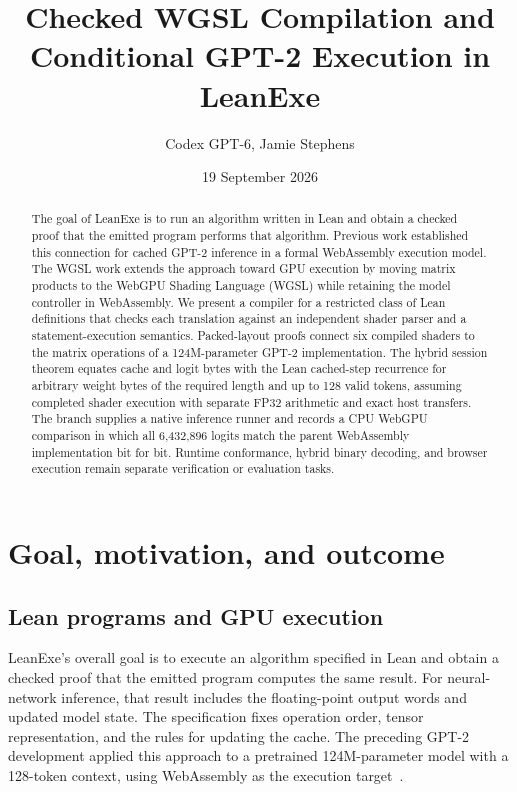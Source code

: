 \documentclass[11pt]{article}
\title{Checked WGSL Compilation and Conditional GPT-2 Execution in LeanExe}
\author{Codex GPT-6, Jamie Stephens}
\date{19 September 2026}
\begin{document}
\maketitle
\begin{abstract}
The goal of LeanExe is to run an algorithm written in Lean and obtain a checked proof that the emitted program performs that algorithm.  Previous work established this connection for cached GPT-2 inference in a formal WebAssembly execution model.  The WGSL work extends the approach toward GPU execution by moving matrix products to the WebGPU Shading Language (WGSL) while retaining the model controller in WebAssembly.  We present a compiler for a restricted class of Lean definitions that checks each translation against an independent shader parser and a statement-execution semantics.  Packed-layout proofs connect six compiled shaders to the matrix operations of a 124M-parameter GPT-2 implementation.  The hybrid session theorem equates cache and logit bytes with the Lean cached-step recurrence for arbitrary weight bytes of the required length and up to 128 valid tokens, assuming completed shader execution with separate FP32 arithmetic and exact host transfers.  The branch supplies a native inference runner and records a CPU WebGPU comparison in which all 6,432,896 logits match the parent WebAssembly implementation bit for bit.  Runtime conformance, hybrid binary decoding, and browser execution remain separate verification or evaluation tasks.
\end{abstract}

\section{Goal, motivation, and outcome}

\subsection{Lean programs and GPU execution}

LeanExe's overall goal is to execute an algorithm specified in Lean and obtain a checked proof that the emitted program computes the same result.  For neural-network inference, that result includes the floating-point output words and updated model state.  The specification fixes operation order, tensor representation, and the rules for updating the cache.  The preceding GPT-2 development applied this approach to a pretrained 124M-parameter model with a 128-token context, using WebAssembly as the execution target~\cite{parent}.
\end{document}

